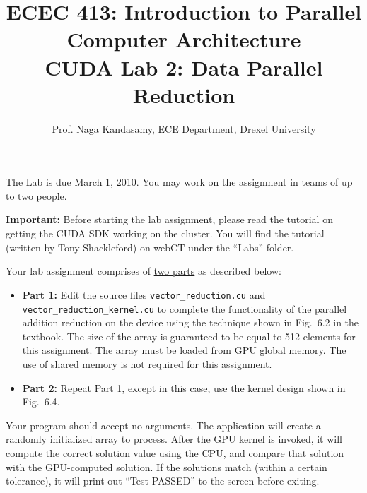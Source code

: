 \documentclass[11.5pt]{article}
\begin{document}
\newcommand{\captionfonts}{\bf}{\small}
\makeatletter  %
\long\def\@makecaption#1#2{%
  \vskip\abovecaptionskip
  \sbox\@tempboxa{{\captionfonts #1: #2}}%
  \ifdim \wd\@tempboxa >\hsize
    {\captionfonts #1: #2\par}
  \else
    \hbox to\hsize{\hfil\box\@tempboxa\hfil}%
  \fi
  \vskip\belowcaptionskip}
\makeatother   %
\renewcommand{\figurename}{Fig.} %

\title{ECEC 413: Introduction to Parallel Computer Architecture \\ CUDA Lab 2: Data Parallel Reduction}
\author{Prof. Naga Kandasamy, ECE Department, Drexel University}
\maketitle %
\date{}

\noindent The Lab is due March 1, 2010. You may work on the assignment in teams of up to two people.
\vspace{12pt}

\noindent \textbf{Important:} Before starting the lab assignment, please read the tutorial on getting the CUDA SDK working on the cluster. You will find the tutorial (written by Tony Shackleford) on webCT under the ``Labs'' folder. \vspace{12pt}

\noindent Your lab assignment comprises of \underline{two parts} as described below:
\begin{itemize}
\item \textbf{Part 1:} Edit the source files \texttt{vector\_reduction.cu} and \texttt{vector\_reduction\_kernel.cu} to complete the functionality of the parallel addition reduction on the device using the technique shown in Fig.~6.2 in the textbook.  The size of the array is guaranteed to be equal to 512 elements for this assignment. The array must be loaded from GPU global memory. The use of shared memory is not required for this assignment.
    
\item \textbf{Part 2:} Repeat Part 1, except in this case, use the kernel design shown in Fig.~6.4.
\end{itemize}   

\noindent Your program should accept no arguments. The application will create a randomly initialized array to
    process. After the GPU kernel is invoked, it will compute the correct solution value using the CPU, and compare that solution with the GPU-computed solution.  If the solutions match (within a certain tolerance), it will print out ``Test PASSED'' to the screen before exiting. \vspace{12pt}
    
\end{document}
